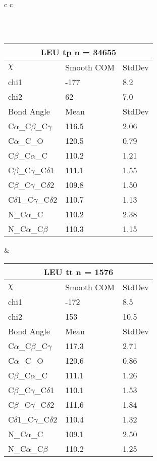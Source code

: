 \begin{longtable}{ c c }
\begin{tabular}{ l l l }
  \bottomrule
  \end{tabular}
  \\
  \begin{tabular}{ l l l }
  \toprule
  \multicolumn{3}{c}{LEU \textbf{tp} n = 34655} \\ \toprule
  $\chi$       & Smooth COM & StdDev \\ \midrule
  chi1 & -177 & 8.2 \\ 
  chi2 & 62 & 7.0 \\ \midrule
  Bond Angle   & Mean     & StdDev \\ \midrule
  C$\alpha$\_C$\beta$\_C$\gamma$ & 116.5 & 2.06\\
  C$\alpha$\_C\_O & 120.5 & 0.79\\
  C$\beta$\_C$\alpha$\_C & 110.2 & 1.21\\
  C$\beta$\_C$\gamma$\_C$\delta$1 & 111.1 & 1.55\\
  C$\beta$\_C$\gamma$\_C$\delta$2 & 109.8 & 1.50\\
  C$\delta$1\_C$\gamma$\_C$\delta$2 & 110.7 & 1.13\\
  N\_C$\alpha$\_C & 110.2 & 2.38\\
  N\_C$\alpha$\_C$\beta$ & 110.3 & 1.15\\
  \bottomrule
  \end{tabular}
  &
  \begin{tabular}{ l l l }
  \toprule
  \multicolumn{3}{c}{LEU \textbf{tt} n = 1576} \\ \toprule
  $\chi$       & Smooth COM & StdDev \\ \midrule
  chi1 & -172 & 8.5 \\ 
  chi2 & 153 & 10.5 \\ \midrule
  Bond Angle   & Mean     & StdDev \\ \midrule
  C$\alpha$\_C$\beta$\_C$\gamma$ & 117.3 & 2.71\\
  C$\alpha$\_C\_O & 120.6 & 0.86\\
  C$\beta$\_C$\alpha$\_C & 111.1 & 1.26\\
  C$\beta$\_C$\gamma$\_C$\delta$1 & 110.1 & 1.53\\
  C$\beta$\_C$\gamma$\_C$\delta$2 & 111.6 & 1.84\\
  C$\delta$1\_C$\gamma$\_C$\delta$2 & 110.4 & 1.32\\
  N\_C$\alpha$\_C & 109.1 & 2.50\\
  N\_C$\alpha$\_C$\beta$ & 110.2 & 1.25\\
  \bottomrule
  \end{tabular}
  \\

\end{longtable}
